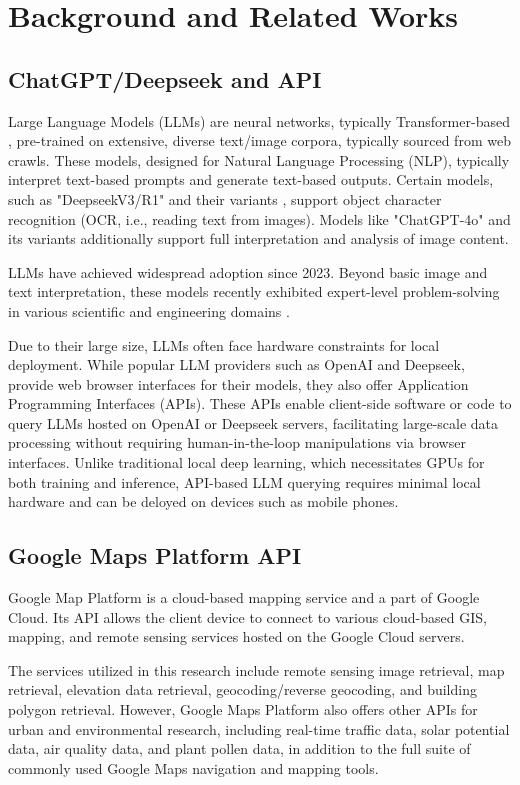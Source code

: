 \section{Background and Related Works}


\subsection{ChatGPT/Deepseek and API}
Large Language Models (LLMs) are neural networks, typically Transformer-based \cite{transformer}, pre-trained on extensive, diverse text/image corpora, typically sourced from web crawls. These models, designed for Natural Language Processing (NLP), typically interpret text-based prompts and generate text-based outputs. Certain models, such as "DeepseekV3/R1" and their variants \cite{deepseekv3, deepseekr1}, support object character recognition (OCR, i.e., reading text from images). Models like "ChatGPT-4o" \cite{gpt4} and its variants additionally support full interpretation and analysis of image content.

LLMs have achieved widespread adoption since 2023. Beyond basic image and text interpretation, these models recently exhibited expert-level problem-solving in various scientific and engineering domains \cite{gpqa, math500}.

Due to their large size, LLMs often face hardware constraints for local deployment. While popular LLM providers such as OpenAI and Deepseek, provide web browser interfaces for their models, they also offer Application Programming Interfaces (APIs). These APIs enable client-side software or code to query LLMs hosted on OpenAI or Deepseek servers, facilitating large-scale data processing without requiring human-in-the-loop manipulations via browser interfaces. Unlike traditional local deep learning, which necessitates GPUs for both training and inference, API-based LLM querying requires minimal local hardware and can be deloyed on devices such as mobile phones. 

\subsection{Google Maps Platform API}
Google Map Platform is a cloud-based mapping service and a part of Google Cloud. Its API allows the client device to connect to various cloud-based GIS, mapping, and remote sensing services hosted on the Google Cloud servers. 

The services utilized in this research include remote sensing image retrieval, map retrieval, elevation data retrieval, geocoding/reverse geocoding, and building polygon retrieval. However, Google Maps Platform also offers other APIs for urban and environmental research, including real-time traffic data, solar potential data, air quality data, and plant pollen data, in addition to the full suite of commonly used Google Maps navigation and mapping tools. 

